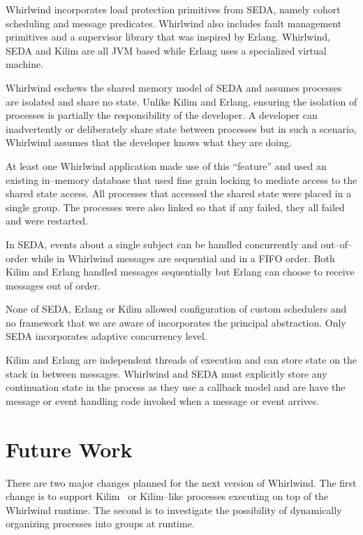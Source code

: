 \documentclass[conference]{IEEEtran}
\begin{document}
Whirlwind incorporates load protection primitives from SEDA, namely cohort scheduling and message predicates. Whirlwind also includes fault management primitives and a supervisor library that was inspired by Erlang. Whirlwind, SEDA and Kilim are all JVM based while Erlang uses a specialized virtual machine.

Whirlwind eschews the shared memory model of SEDA and assumes processes are isolated and share no state. Unlike Kilim and Erlang, ensuring the isolation of processes is partially the responsibility of the developer. A developer can inadvertently or deliberately share state between processes but in such a scenario, Whirlwind assumes that the developer knows what they are doing. 

At least one Whirlwind application made use of this ``feature'' and used an existing in--memory database that used fine grain locking to mediate access to the shared state access. All processes that accessed the shared state were placed in a single group. The processes were also linked so that if any failed, they all failed and were restarted.

In SEDA, events about a single subject can be handled concurrently and out--of--order while in Whirlwind messages are sequential and in a FIFO order. Both Kilim and Erlang handled messages sequentially but Erlang can choose to receive messages out of order.

None of SEDA, Erlang or Kilim allowed configuration of custom schedulers and no framework that we are aware of incorporates the principal abstraction. Only SEDA incorporates adaptive concurrency level.

Kilim and Erlang are independent threads of execution and can store state on the stack in between messages. Whirlwind and SEDA must explicitly store any continuation state in the process as they use a callback model and are have the message or event handling code invoked when a message or event arrives.

\section{Future Work}

There are two major changes planned for the next version of Whirlwind. The first change is to support Kilim~\cite{Srinivasan:08:Kilim} or Kilim--like processes executing on top of the Whirlwind runtime. The second is to investigate the possibility of dynamically organizing processes into groups at runtime.
\end{document}
